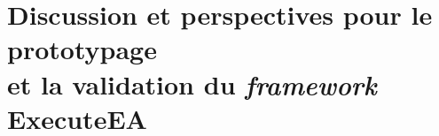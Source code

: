 
%     


%     


%     
















\section[Discussion et perspectives]{Discussion et perspectives pour le prototypage\\
            et la validation du \emph{framework} ExecuteEA}
            \label{sec:discussion_prototype}

